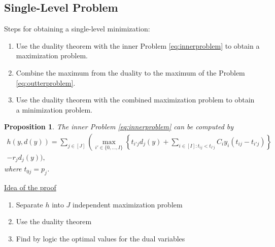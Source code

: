 \documentclass{beamer}
\newtheorem{proposition}{Proposition}
\begin{document}
\subsection{Single-Level Problem}
\begin{frame}[allowframebreaks]
	Steps for obtaining a single-level minimization:
	\begin{enumerate}
		\item Use the duality theorem with the inner Problem \ref{eq:innerproblem} to obtain a maximization problem.
		\item Combine the maximum from the duality to the maximum of the Problem \ref{eq:outterproblem}.
		\item Use the duality theorem with the combined maximization problem to obtain a minimization problem.
	\end{enumerate}
	
	\framebreak
	\begin{proposition}
		The inner Problem \ref{eq:innerproblem} can be computed by
		\begin{equation}
			\label{eq:transformed_h}
			\begin{split}
				h(y, d(y)) = \sum_{j \in [J]} \left(\max_{i' \in \{0, \dots, I\}}\left\{t_{i'j}d_j(y) + \sum_{i \in [I]: t_{ij} < t_{i'j}} C_iy_i(t_{ij} - t_{i'j})\right\}\right.\\ - r_jd_j(y)\Bigg),
			\end{split}
		\end{equation}
		where $t_{0j} = p_j$.
	\end{proposition}
	
	\framebreak
	\underline{Idea of the proof}
	\begin{enumerate}
		\item Separate $h$ into $J$ independent maximization problem
		\item Use the duality theorem
		\item Find by logic the optimal values for the dual variables
	\end{enumerate}
	

\end{frame}
\end{document}
